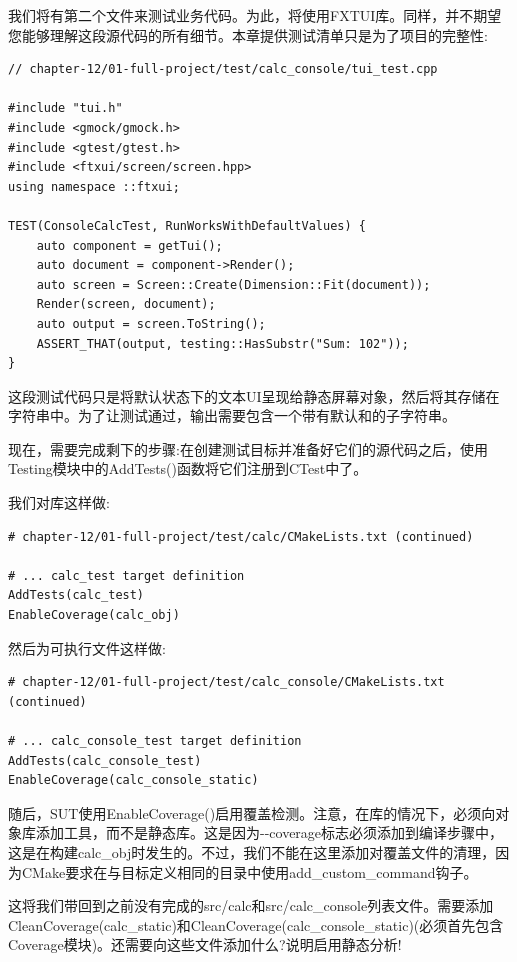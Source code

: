 我们将有第二个文件来测试业务代码。为此，将使用FXTUI库。同样，并不期望您能够理解这段源代码的所有细节。本章提供测试清单只是为了项目的完整性:

\begin{lstlisting}[style=styleCXX]
// chapter-12/01-full-project/test/calc_console/tui_test.cpp

#include "tui.h"
#include <gmock/gmock.h>
#include <gtest/gtest.h>
#include <ftxui/screen/screen.hpp>
using namespace ::ftxui;

TEST(ConsoleCalcTest, RunWorksWithDefaultValues) {
	auto component = getTui();
	auto document = component->Render();
	auto screen = Screen::Create(Dimension::Fit(document));
	Render(screen, document);
	auto output = screen.ToString();
	ASSERT_THAT(output, testing::HasSubstr("Sum: 102"));
}
\end{lstlisting}

这段测试代码只是将默认状态下的文本UI呈现给静态屏幕对象，然后将其存储在字符串中。为了让测试通过，输出需要包含一个带有默认和的子字符串。

现在，需要完成剩下的步骤:在创建测试目标并准备好它们的源代码之后，使用Testing模块中的AddTests()函数将它们注册到CTest中了。

我们对库这样做:

\begin{lstlisting}[style=styleCMake]
# chapter-12/01-full-project/test/calc/CMakeLists.txt (continued)

# ... calc_test target definition
AddTests(calc_test)
EnableCoverage(calc_obj)
\end{lstlisting}

然后为可执行文件这样做:

\begin{lstlisting}[style=styleCMake]
# chapter-12/01-full-project/test/calc_console/CMakeLists.txt (continued)

# ... calc_console_test target definition
AddTests(calc_console_test)
EnableCoverage(calc_console_static)
\end{lstlisting}

随后，SUT使用EnableCoverage()启用覆盖检测。注意，在库的情况下，必须向对象库添加工具，而不是静态库。这是因为-{}-coverage标志必须添加到编译步骤中，这是在构建calc\_obj时发生的。不过，我们不能在这里添加对覆盖文件的清理，因为CMake要求在与目标定义相同的目录中使用add\_custom\_command钩子。

这将我们带回到之前没有完成的src/calc和src/calc\_console列表文件。需要添加CleanCoverage(calc\_static)和CleanCoverage(calc\_console\_static)(必须首先包含Coverage模块)。还需要向这些文件添加什么?说明启用静态分析!

